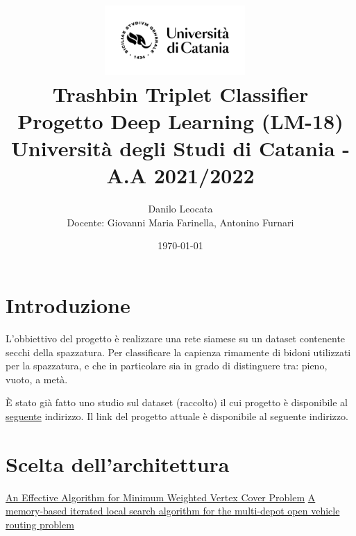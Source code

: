 \documentclass[11pt]{article}
\title{ %
\includegraphics[width=0.4\textwidth]{UniCT-Logo-Nero}~\\
Trashbin Triplet Classifier \\ 
\large Progetto Deep Learning (LM-18) \\ Università degli Studi di Catania - A.A 2021/2022 \\
}
\author{ Danilo Leocata \\ Docente: Giovanni Maria Farinella, Antonino Furnari}
\date{\today}
\begin{document}
\maketitle	
\pagebreak


\section{Introduzione}

L'obbiettivo del progetto è realizzare una rete siamese su un dataset contenente secchi della spazzatura.
Per classificare la capienza rimamente di bidoni utilizzati per la spazzatura, e che in particolare sia in grado di distinguere tra: pieno, vuoto, a metà.

È stato già fatto uno studio sul dataset (raccolto) il cui progetto è disponibile al \href{https://github.com/khalld/trashbin-classifier}{seguente} indirizzo.
Il link del progetto attuale è disponibile al seguente indirizzo.


\section{Scelta dell'architettura}




\pagebreak

\begin{thebibliography}{5}


 \href{https://www.researchgate.net/publication/242463011_An_Effective_Algorithm_for_Minimum_Weighted_Vertex_Cover_problem}{An Effective Algorithm for Minimum Weighted Vertex Cover Problem}
 \href{https://www.sciencedirect.com/science/article/abs/pii/S0377221720300278}{A memory-based iterated local search algorithm for the multi-depot open vehicle routing problem}

\end{thebibliography}


\pagebreak
\end{document}
